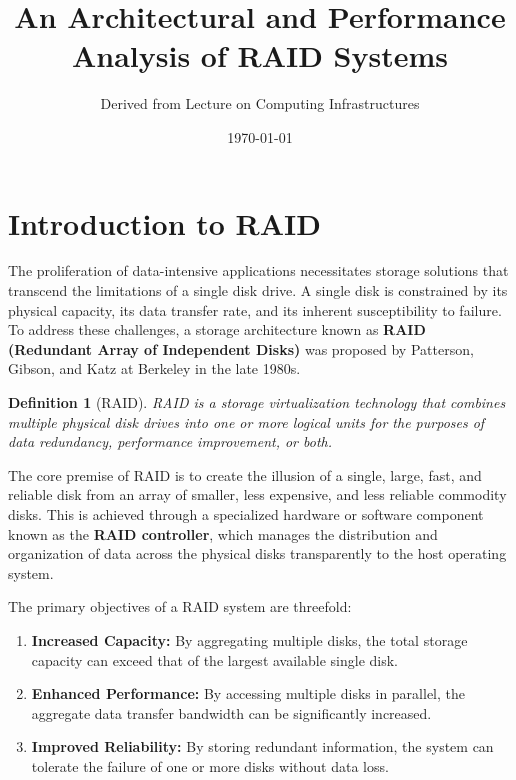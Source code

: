 \documentclass[12pt]{article}
\title{An Architectural and Performance Analysis of RAID Systems}
\author{Derived from Lecture on Computing Infrastructures}
\date{\today}
\newtheorem{definition}{Definition}[section]
\begin{document}
\maketitle
\thispagestyle{empty}

\newpage
\tableofcontents
\newpage

\section{Introduction to RAID}

The proliferation of data-intensive applications necessitates storage solutions that transcend the limitations of a single disk drive. A single disk is constrained by its physical capacity, its data transfer rate, and its inherent susceptibility to failure. To address these challenges, a storage architecture known as \textbf{RAID (Redundant Array of Independent Disks)} was proposed by Patterson, Gibson, and Katz at Berkeley in the late 1980s.

\begin{definition}[RAID]
RAID is a storage virtualization technology that combines multiple physical disk drives into one or more logical units for the purposes of data redundancy, performance improvement, or both.
\end{definition}

The core premise of RAID is to create the illusion of a single, large, fast, and reliable disk from an array of smaller, less expensive, and less reliable commodity disks. This is achieved through a specialized hardware or software component known as the \textbf{RAID controller}, which manages the distribution and organization of data across the physical disks transparently to the host operating system.

The primary objectives of a RAID system are threefold:
\begin{enumerate}[label=\textbf{\arabic*.}]
    \item \textbf{Increased Capacity:} By aggregating multiple disks, the total storage capacity can exceed that of the largest available single disk.
    \item \textbf{Enhanced Performance:} By accessing multiple disks in parallel, the aggregate data transfer bandwidth can be significantly increased.
    \item \textbf{Improved Reliability:} By storing redundant information, the system can tolerate the failure of one or more disks without data loss.
\end{enumerate}
\end{document}
